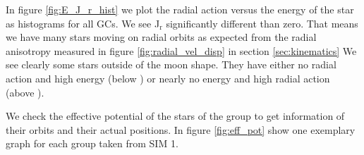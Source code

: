 In figure \ref{fig:E_J_r_hist} we plot the radial action versus the energy of the star as histograms for all \acp{GC}. We see J\(_\mathrm{r}\) significantly different than zero. That means we have many stars moving on radial orbits as expected from the radial anisotropy measured in figure \ref{fig:radial_vel_disp} in section \ref{sec:kinematics} We see clearly some stars outside of the moon shape. They have either no radial action and high energy (below ) or nearly no energy and high radial action (above ). 

\par We check the effective potential of the stars of the group to get information of their orbits and their actual positions. In figure \ref{fig:eff_pot} show one exemplary graph for each group taken from SIM 1. 

